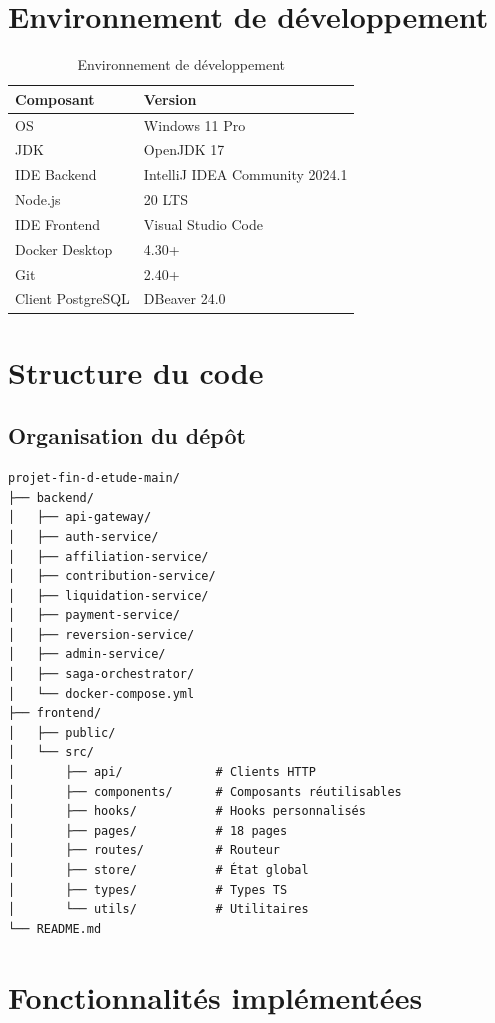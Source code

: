 \documentclass[12pt,a4paper,oneside]{report}
\begin{document}
\section{Environnement de développement}
\begin{table}[H]
\centering
\caption{Environnement de développement}
\begin{tabular}{ll}
\toprule
\textbf{Composant} & \textbf{Version} \\
\midrule
OS & Windows 11 Pro \\
JDK & OpenJDK 17 \\
IDE Backend & IntelliJ IDEA Community 2024.1 \\
Node.js & 20 LTS \\
IDE Frontend & Visual Studio Code \\
Docker Desktop & 4.30+ \\
Git & 2.40+ \\
Client PostgreSQL & DBeaver 24.0 \\
\bottomrule
\end{tabular}
\end{table}

\section{Structure du code}

\subsection{Organisation du dépôt}
\begin{lstlisting}[caption={Structure du dépôt}]
projet-fin-d-etude-main/
├── backend/
│   ├── api-gateway/
│   ├── auth-service/
│   ├── affiliation-service/
│   ├── contribution-service/
│   ├── liquidation-service/
│   ├── payment-service/
│   ├── reversion-service/
│   ├── admin-service/
│   ├── saga-orchestrator/
│   └── docker-compose.yml
├── frontend/
│   ├── public/
│   └── src/
│       ├── api/             # Clients HTTP
│       ├── components/      # Composants réutilisables
│       ├── hooks/           # Hooks personnalisés
│       ├── pages/           # 18 pages
│       ├── routes/          # Routeur
│       ├── store/           # État global
│       ├── types/           # Types TS
│       └── utils/           # Utilitaires
└── README.md
\end{lstlisting}

\section{Fonctionnalités implémentées}
\end{document}
